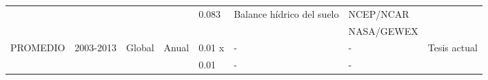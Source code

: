 \begin{sidewaystable}
\begin{tabular}{llllllll}
             &           &           &            & 0.083      & Balance hídrico del suelo & NCEP/NCAR  &                 \\
             &           &           &            &            &                           & NASA/GEWEX &                 \\
PROMEDIO         & 2003-2013 & Global    & Anual      & 0.01 x     & -                         & -          & Tesis actual    \\
             &           &           &            & 0.01       & -                         & -          &                  \\ \hline 
\end{tabular}

\end{sidewaystable}
